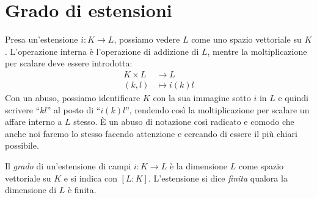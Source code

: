 
\section{Grado di estensioni}

Presa un'estensione \(i : K \to L\), possiamo vedere \(L\) come uno spazio vettoriale su \(K\). L'operazione interna è l'operazione di addizione di \(L\), mentre la moltiplicazione per scalare deve essere introdotta:
\begin{align*}
K \times L &\to L \\
(k, l) &\mapsto i(k)l
\end{align*}
Con un abuso, possiamo identificare \(K\) con la sua immagine sotto \(i\) in \(L\) e quindi scrivere \enquote{\(kl\)} al posto di \enquote{\(i(k)l\)}, rendendo così la moltiplicazione per scalare un affare interno a \(L\) stesso. È un abuso di notazione così radicato e comodo che anche noi faremo lo stesso facendo attenzione e cercando di essere il più chiari possibile.


\begin{defi}
Il {\em grado} di un'estensione di campi \(i : K \to L\) è la dimensione \(L\) come spazio vettoriale su \(K\) e si indica con \([L:K]\). L'estensione si dice {\em finita} qualora la dimensione di \(L\) è finita.
\end{defi}

